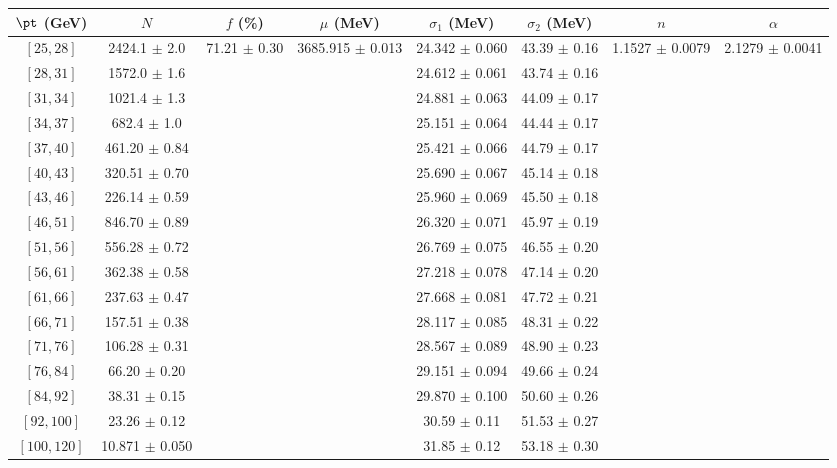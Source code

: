 \begin{tabular}{c||c|c|c|c|c|c|c}
$\pt$ (GeV) & $N$ & $f$ (\%) & $\mu$ (MeV) & $\sigma_1$ (MeV) & $\sigma_2$ (MeV) & $n$ & $\alpha$ \\
\hline
$[25, 28]$ & 2424.1 $\pm$ 2.0 & \multirow{17}{*}{71.21 $\pm$ 0.30} & \multirow{17}{*}{3685.915 $\pm$ 0.013} & 24.342 $\pm$ 0.060 & 43.39 $\pm$ 0.16 & \multirow{17}{*}{1.1527 $\pm$ 0.0079} & \multirow{17}{*}{2.1279 $\pm$ 0.0041}\\
$[28, 31]$ & 1572.0 $\pm$ 1.6 &  &  & 24.612 $\pm$ 0.061 & 43.74 $\pm$ 0.16 &  & \\
$[31, 34]$ & 1021.4 $\pm$ 1.3 &  &  & 24.881 $\pm$ 0.063 & 44.09 $\pm$ 0.17 &  & \\
$[34, 37]$ & 682.4 $\pm$ 1.0 &  &  & 25.151 $\pm$ 0.064 & 44.44 $\pm$ 0.17 &  & \\
$[37, 40]$ & 461.20 $\pm$ 0.84 &  &  & 25.421 $\pm$ 0.066 & 44.79 $\pm$ 0.17 &  & \\
$[40, 43]$ & 320.51 $\pm$ 0.70 &  &  & 25.690 $\pm$ 0.067 & 45.14 $\pm$ 0.18 &  & \\
$[43, 46]$ & 226.14 $\pm$ 0.59 &  &  & 25.960 $\pm$ 0.069 & 45.50 $\pm$ 0.18 &  & \\
$[46, 51]$ & 846.70 $\pm$ 0.89 &  &  & 26.320 $\pm$ 0.071 & 45.97 $\pm$ 0.19 &  & \\
$[51, 56]$ & 556.28 $\pm$ 0.72 &  &  & 26.769 $\pm$ 0.075 & 46.55 $\pm$ 0.20 &  & \\
$[56, 61]$ & 362.38 $\pm$ 0.58 &  &  & 27.218 $\pm$ 0.078 & 47.14 $\pm$ 0.20 &  & \\
$[61, 66]$ & 237.63 $\pm$ 0.47 &  &  & 27.668 $\pm$ 0.081 & 47.72 $\pm$ 0.21 &  & \\
$[66, 71]$ & 157.51 $\pm$ 0.38 &  &  & 28.117 $\pm$ 0.085 & 48.31 $\pm$ 0.22 &  & \\
$[71, 76]$ & 106.28 $\pm$ 0.31 &  &  & 28.567 $\pm$ 0.089 & 48.90 $\pm$ 0.23 &  & \\
$[76, 84]$ & 66.20 $\pm$ 0.20 &  &  & 29.151 $\pm$ 0.094 & 49.66 $\pm$ 0.24 &  & \\
$[84, 92]$ & 38.31 $\pm$ 0.15 &  &  & 29.870 $\pm$ 0.100 & 50.60 $\pm$ 0.26 &  & \\
$[92, 100]$ & 23.26 $\pm$ 0.12 &  &  & 30.59 $\pm$ 0.11 & 51.53 $\pm$ 0.27 &  & \\
$[100, 120]$ & 10.871 $\pm$ 0.050 &  &  & 31.85 $\pm$ 0.12 & 53.18 $\pm$ 0.30 &  & \\
\end{tabular}
